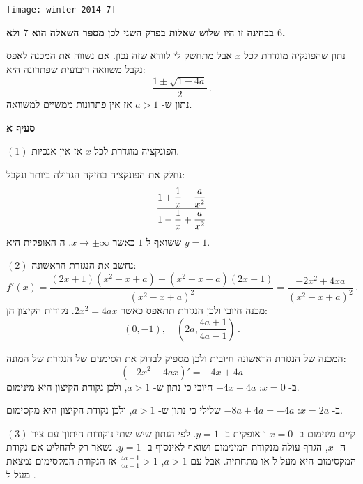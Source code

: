 \begin{center}
\texttt{[image: winter-2014-7]}
\end{center}

\vspace{-4ex}

\textbf{בבחינה זו היו שלוש שאלות בפרק השני לכן מספר השאלה הוא 
$7$
ולא 
$6$.}

נתון שהפונקיה מוגדרת לכל 
$x$
אבל מתחשק לי לוודא שזה נכון. אם נשווה את המכנה לאפס נקבל משוואה ריבועית שפתרונה היא:
\[
\frac{1\pm\sqrt{1-4a}}{2}\,.
\]
נתון ש-%
$a>1$
אז אין פתרונות ממשיים למשוואה.

\textbf{סעיף א}

$(1)$
הפונקציה מוגדרת לכל 
$x$
אז אין 
\asms{}
אנכיות.

נחלק את הפונקציה בחזקה הגדולה ביותר ונקבל:
\[
\displaystyle\frac{1+\displaystyle\frac{1}{x}-\displaystyle\frac{a}{x^2}}{1-\displaystyle\frac{1}{x}+\displaystyle\frac{a}{x^2}}
\]
ששואף ל
$1$
כאשר 
$x\rightarrow \pm\infty$.
ה%
\asm{}
האופקית היא
$y=1$.


$(2)$
נחשב את הנגזרת הראשונה:
\[
f'(x) =\frac{(2x+1)(x^2-x+a)-(x^2+x-a)(2x-1)}{(x^2-x+a)^2}=\frac{-2x^2+4xa}{(x^2-x+a)^2}\,.
\]
מכנה חיובי ולכן הנגזרת תתאפס כאשר
$2x^2=4ax$.
נקודות הקיצון הן:
\[
(0,-1),\quad \left(2a,\frac{4a+1}{4a-1}\right)\,.
\]

\np

המכנה של הנגזרת הראשונה חיובית ולכן מספיק לבדוק  את הסימנים של הנגזרת של המונה:
\[
(-2x^2+4ax)'=-4x+4a
\]
ב-%
$x=0$:
$-4x+4a$
חיובי כי נתון ש-%
$a>1$,
ולכן נקודת הקיצון היא מינימום.

ב-%
$x=2a$:
$-8a+4a=-4a$
שלילי כי נתון ש-%
$a>1$,
ולכן נקודת הקיצון היא מקסימום.



$(3)$
קיים מינימום ב-%
$x=0$
ו%
\asm{}
אופקית ב-%
$y=1$.
לפי הנתון שיש שתי נוקודות חיתוך עם ציר ה-%
$x$,
הגרף עולה מנקודת המינימום ושואף לאינסוף ב-%
$y=1$.
נשאר רק להחליט אם נקודת המקסימום היא מעל ל%
\asm{}
או מתחתיה. אבל עם
$a>1$,
$\frac{4a+1}{4a-1}>1$
אז הנקודת המקסימום נמצאת מעל ל%
\asm{}.



\begin{center}
\end{center}


